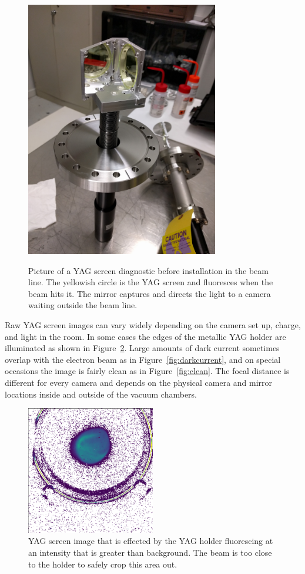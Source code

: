 \begin{figure}
	\centering
	\includegraphics[width=0.75\textwidth]{images/YAG_screen}
	\label{fig:YAGscreen}
	\caption{Picture of a YAG screen diagnostic before installation in the beam line.
	The yellowish circle is the YAG screen and fluoresces when the beam hits it. 
	The mirror captures and directs the light to a camera waiting outside the beam line.}
\end{figure}
Raw YAG screen images can vary widely depending on the camera set up, charge, and 
light in the room. In some cases the edges of the metallic YAG holder
 are illuminated as shown in Figure~\ref{fig:yag-holder}.
Large amounts of dark current sometimes overlap with the electron beam as in Figure~\ref{fig:darkcurrent}, 
and on special occasions the image is fairly clean as in Figure~\ref{fig:clean}. 
The focal distance is different for every camera and depends on the physical camera and mirror
locations inside and outside of the vacuum chambers.
\begin{figure}	
	\centering
	\includegraphics[width=0.5\textwidth]{images/yag-in-image}
	\caption{YAG screen image that is effected by the YAG holder fluorescing at an intensity that is greater than 
		background. The beam is too close to the holder to safely crop this area out.}
	\label{fig:yag-holder}
\end{figure}
